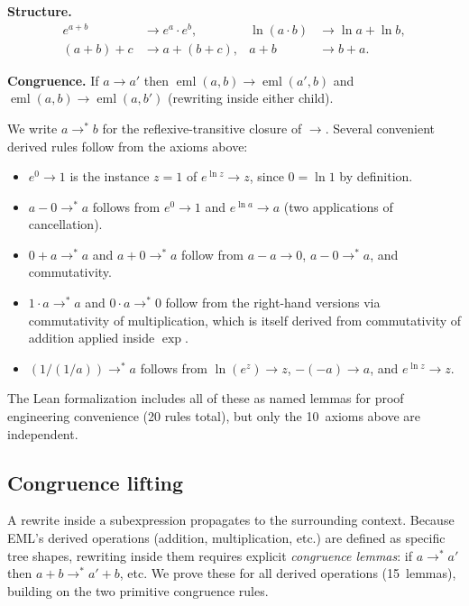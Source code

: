 \documentclass[11pt]{article}
\begin{document}
\noindent
\textbf{Structure.}
\begin{align}
  e^{a+b}    &\to e^a \cdot e^b, &
  \ln(a \cdot b) &\to \ln a + \ln b, \label{eq:hom}\\
  (a+b)+c    &\to a+(b+c), &
  a + b      &\to b + a. \label{eq:add-struct}
\end{align}

\noindent
\textbf{Congruence.} If $a \to a'$ then
$\operatorname{eml}(a,b) \to \operatorname{eml}(a',b)$ and
$\operatorname{eml}(a,b) \to \operatorname{eml}(a,b')$
(rewriting inside either child).

\medskip
We write $a \to^{*} b$ for the reflexive-transitive closure of $\to$.
Several convenient derived rules follow from the axioms above:
\begin{itemize}
\item $e^0 \to 1$ is the instance $z = 1$ of $e^{\ln z} \to z$,
  since $0 = \ln 1$ by definition.
\item $a - 0 \to^{*} a$ follows from $e^0 \to 1$ and
  $e^{\ln a} \to a$ (two applications of cancellation).
\item $0 + a \to^{*} a$ and $a + 0 \to^{*} a$ follow from
  $a - a \to 0$, $a - 0 \to^{*} a$, and commutativity.
\item $1 \cdot a \to^{*} a$ and $0 \cdot a \to^{*} 0$ follow from
  the right-hand versions via commutativity of multiplication, which
  is itself derived from commutativity of addition
  applied inside $\exp$.
\item $(1/(1/a)) \to^{*} a$ follows from $\ln(e^z) \to z$,
  $-(-a) \to a$, and $e^{\ln z} \to z$.
\end{itemize}
The Lean formalization includes all of these as named lemmas for
proof engineering convenience (20 rules total), but only the
10~axioms above are independent.

\subsection{Congruence lifting}

A rewrite inside a subexpression propagates to the surrounding context.
Because EML's derived operations (addition, multiplication, etc.)
are defined as specific tree shapes, rewriting inside them requires
explicit \emph{congruence lemmas}: if $a \to^{*} a'$ then
$a + b \to^{*} a' + b$, etc.  We prove these for all derived operations
(15~lemmas), building on the two primitive congruence rules.

\end{document}
